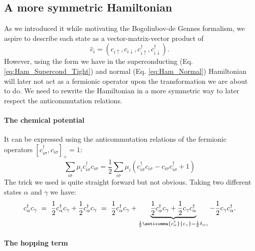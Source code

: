 \documentclass[../main.tex]{subfile}
\begin{document}
\subsection{A more symmetric Hamiltonian}\label{sec:Symmetric_Ham}
As we introduced it while motivating the Bogoliubov-de Gennes formalism, we aspire to describe each state as a vector-matrix-vector product of
\[
    \hat{c}_i = \left(c_{i\uparrow}, c_{i\downarrow},c_{i\uparrow}^{\dagger}, c_{i\downarrow}^{\dagger}\right).
\]
However, using the form we have in the superconducting (Eq. \ref{eq:Ham_Supercond_Tight}) and normal (Eq. \ref{eq:Ham_Normal}) 
Hamiltonian will later not act as a fermionic operator upon the transformation we are about to
do. We need to rewrite the Hamiltonian in a more symmetric way to later respect the anticommutation relations.\\

\paragraph{The chemical potential} $~$\\

It can be expressed using the anticommutation relations of the fermionic operators $[c_{i\sigma}^{\dagger},c_{i\sigma}]_+ = 1$:
\begin{equation}\label{eq:SymHam_muTerm}
    \sum_{i\sigma} \mu_i c_{i\sigma}^{\dagger} c_{i\sigma} = \frac{1}{2}\sum_{i\sigma} \mu_i \left(c_{i\sigma}^{\dagger}c_{i\sigma} - c_{i\sigma}c_{i\sigma}^{\dagger} + 1\right)
\end{equation}
The trick we used is quite straight forward but not obvious. Taking two different states $\alpha$ and $\gamma$ we have:
\begin{equation}\label{eq:Trick1}
    c^{\dagger}_{\alpha}c_{\gamma} ~=~ \frac{1}{2}c^{\dagger}_{\alpha}c_{\gamma} + \frac{1}{2}c^{\dagger}_{\alpha}c_{\gamma} ~=~ \frac{1}{2}c^{\dagger}_{\alpha}c_{\gamma} + \underbrace{\frac{1}{2}c^{\dagger}_{\alpha}c_{\gamma} + \frac{1}{2}c_{\gamma}c^{\dagger}_{\alpha}}_{\frac{1}{2}\anticommu{c^{\dagger}_{\alpha}}{c_{\gamma}} = \frac{1}{2}\delta_{\alpha\gamma}} - \frac{1}{2}c_{\gamma}c^{\dagger}_{\alpha}. 
\end{equation}
\paragraph{The hopping term} $~$\\
\end{document}
